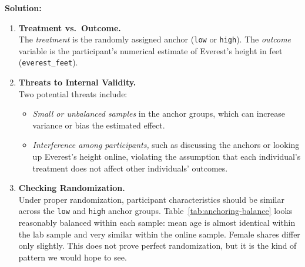 \documentclass[12pt]{article}
\begin{document}
\noindent \textbf{Solution:}

\begin{enumerate}
  \item \textbf{Treatment vs.\ Outcome.}\\
  The \emph{treatment} is the randomly assigned anchor (\texttt{low} or \texttt{high}). The \emph{outcome} variable is the participant’s numerical estimate of Everest’s height in feet (\texttt{everest\_feet}).

  \item \textbf{Threats to Internal Validity.}\\
  Two potential threats include:
  \begin{itemize}
    \item \emph{Small or unbalanced samples} in the anchor groups, which can increase variance or bias the estimated effect.
    \item \emph{Interference among participants,} such as discussing the anchors or looking up Everest’s height online, violating the assumption that each individual’s treatment does not affect other individuals’ outcomes.
  \end{itemize}


  \item \textbf{Checking Randomization.}\\
  Under proper randomization, participant characteristics should be similar across the \texttt{low} and \texttt{high} anchor groups. Table~\ref{tab:anchoring-balance} looks reasonably balanced within each sample: mean age is almost identical within the lab sample and very similar within the online sample. Female shares differ only slightly. This does not prove perfect randomization, but it is the kind of pattern we would hope to see.


\end{enumerate}
\end{document}
